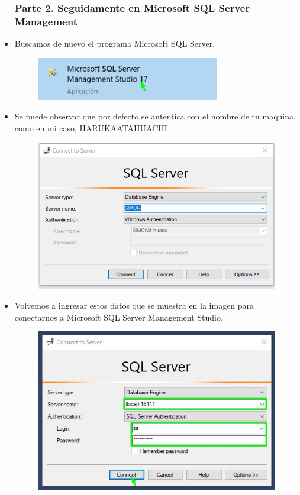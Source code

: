 \begin{itemize}
				\subsubsection{Parte 2. Seguidamente en Microsoft SQL Server Management}
					\item Buscamos de nuevo el programa Microsoft SQL Server.
						\begin{figure}[htb]
							\begin{center}
								\includegraphics[width=8cm]{./Imagenes/BuscarSQL}
							\end{center}
						\end{figure}
					\item Se puede observar que por defecto se autentica con el nombre de tu maquina, como en mi caso, HARUKAATAHUACHI
						\begin{figure}[htb]
							\begin{center}
								\includegraphics[width=12cm]{./Imagenes/ConectarseSql01}
							\end{center}
						\end{figure}
						\vspace{9cm}
					\item Volvemos a ingresar estos datos que se muestra en la imagen para conectarnos a Microsoft SQL Server Management Studio.
						 \begin{figure}[htb]
							\begin{center}
								\includegraphics[width=12cm]{./Imagenes/ConectarseSql02}

\end{center}
\end{figure}
\end{itemize}
